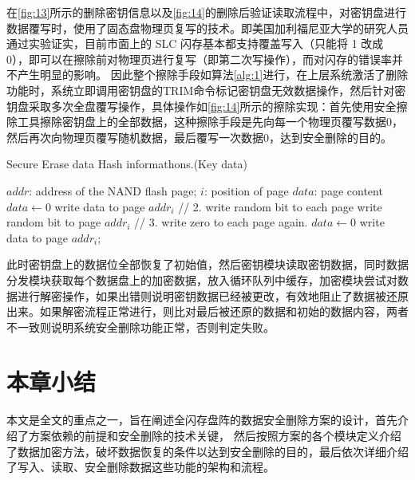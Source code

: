 在\autoref{fig:13}所示的删除密钥信息以及\autoref{fig:14}的删除后验证读取流程中，对密钥盘进行数据覆写时，使用了固态盘物理页复写的技术。即美国加利福尼亚大学的研究人员通过实验证实\cite{Wei2011Reliably}，目前市面上的 SLC 闪存基本都支持覆盖写入（只能将 1 改成 0），即可以在擦除前对物理页进行复写（即第二次写操作），而对闪存的错误率并不产生明显的影响。
因此整个擦除手段如算法\autoref{alg:1}进行，在上层系统激活了删除功能时，系统立即调用密钥盘的TRIM命令标记密钥盘无效数据操作，然后针对密钥盘采取多次全盘覆写操作，具体操作如\autoref{fig:14}所示的擦除实现：首先使用安全擦除工具擦除密钥盘上的全部数据，这种擦除手段是先向每一个物理页覆写数据0，然后再次向物理页覆写随机数据，最后覆写一次数据0，达到安全删除的目的。
\begin{algorithm}[H]
\caption{Secure Erase data Hash informathons.(Key data)}
\label{alg:1}
\begin{algorithmic}
	\REQUIRE
	$addr$: address of the NAND flash page;
	$i$: position of page
	$data$: page content
	\STATE $data \gets 0$
	\STATE write data to page $addr_i$
	\ENDFOR
	\STATE // 2. write random bit to each page
	\STATE write random bit to page $addr_i$
	\ENDFOR
	\STATE // 3. write zero to each page again.
	\STATE $data \gets 0$
	\STATE write data to page $addr_i$;
	\ENDFOR
\end{algorithmic}
\end{algorithm}


此时密钥盘上的数据位全部恢复了初始值，然后密钥模块读取密钥数据，同时数据分发模块获取每个数据盘上的加密数据，放入循环队列中缓存，加密模块尝试对数据进行解密操作，如果出错则说明密钥数据已经被更改，有效地阻止了数据被还原出来。如果解密流程正常进行，则比对最后被还原的数据和初始的数据内容，两者不一致则说明系统安全删除功能正常，否则判定失败。

\section{本章小结}
本文是全文的重点之一，旨在阐述全闪存盘阵的数据安全删除方案的设计，首先介绍了方案依赖的前提和安全删除的技术关键，
然后按照方案的各个模块定义介绍了数据加密方法，破坏数据恢复的条件以达到安全删除的目的，最后依次详细介绍了写入、读取、安全删除数据这些功能的架构和流程。
